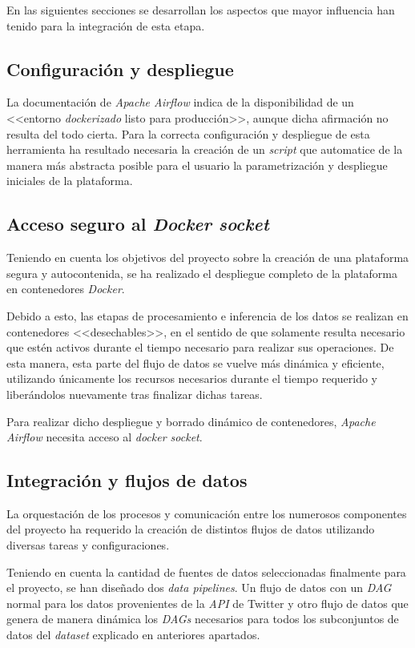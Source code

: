 En las siguientes secciones se desarrollan los aspectos que mayor influencia han tenido para la integración de esta etapa.

\subsection{Configuración y despliegue}

La documentación de \textit{Apache Airflow} indica de la disponibilidad de un <<entorno \textit{dockerizado} listo para producción>>, aunque dicha afirmación no resulta del todo cierta. Para la correcta configuración y despliegue de esta herramienta ha resultado necesaria la creación de un \textit{script} que automatice de la manera más abstracta posible para el usuario la parametrización y despliegue iniciales de la plataforma.

\subsection{Acceso seguro al \textit{Docker socket}}

Teniendo en cuenta los objetivos del proyecto sobre la creación de una plataforma segura y autocontenida, se ha realizado el despliegue completo de la plataforma en contenedores \textit{Docker}.

Debido a esto, las etapas de procesamiento e inferencia de los datos se realizan en contenedores <<desechables>>, en el sentido de que solamente resulta necesario que estén activos durante el tiempo necesario para realizar sus operaciones. De esta manera, esta parte del flujo de datos se vuelve más dinámica y eficiente, utilizando únicamente los recursos necesarios durante el tiempo requerido y liberándolos nuevamente tras finalizar dichas tareas.

Para realizar dicho despliegue y borrado dinámico de contenedores, \textit{Apache Airflow} necesita acceso al \textit{docker socket}.

\subsection{Integración y flujos de datos}

La orquestación de los procesos y comunicación entre los numerosos componentes del proyecto ha requerido la creación de distintos flujos de datos utilizando diversas tareas y configuraciones.

Teniendo en cuenta la cantidad de fuentes de datos seleccionadas finalmente para el proyecto, se han diseñado dos \textit{data pipelines}. Un flujo de datos con un \textit{DAG} normal para los datos provenientes de la \textit{API} de Twitter y otro flujo de datos que genera de manera dinámica los \textit{DAGs} necesarios para todos los subconjuntos de datos del \textit{dataset} explicado en anteriores apartados.  

